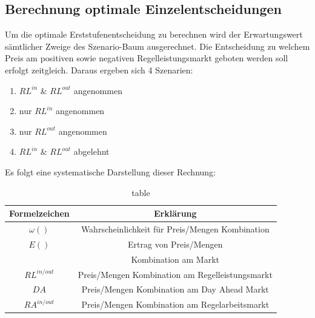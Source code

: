 \subsection{Berechnung optimale Einzelentscheidungen}
Um die optimale Erststufenentscheidung zu berechnen wird der Erwartungswert sämtlicher Zweige des Szenario-Baum ausgerechnet.
Die Entscheidung zu welchem Preis am positiven sowie negativen Regelleistungsmarkt geboten werden soll erfolgt zeitgleich.
Daraus ergeben sich 4 Szenarien:
\begin{enumerate}
	\item $RL^{in}$ \& $RL^{out}$ angenommen
	\item nur $RL^{in}$ angenommen
	\item nur $RL^{out}$ angenommen
	\item $RL^{in}$ \& $RL^{out}$ abgelehnt
\end{enumerate}
Es folgt eine systematische Darstellung dieser Rechnung:
\begin{table}


	\begin{tabular}{|c|c|}
		\hline
		Formelzeichen & Erklärung                                       \\
		\hline
		$\omega()$    & Wahrscheinlichkeit für Preis/Mengen Kombination \\
		$E()$         & Ertrag von Preis/Mengen                         \\
		              & Kombination am Markt                            \\
		$RL^{in/out}$ & Preis/Mengen Kombination am Regelleistungsmarkt \\
		$DA$          & Preis/Mengen Kombination am Day Ahead Markt     \\
		$RA^{in/out}$ & Preis/Mengen Kombination am Regelarbeitsmarkt   \\
		\hline
	\end{tabular}
	\caption{table}
	\label{tab:my_label}
\end{table}

